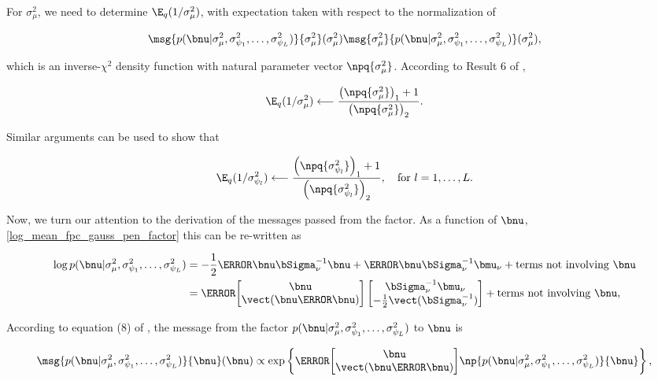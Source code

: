 \documentclass[12pt]{article}
\theoremstyle{plain}
\theoremstyle{definition}
\theoremstyle{remark}
\def\Sigmanu{\bSigma_{\nu}}
\def\munu{\bmu_{\nu}}
\def\sigsqmu{\sigma^2_{\mu}}
\newcommand\sigsqpsi[1]{\sigma^2_{\psi_{#1}}}
\newcommand\tni[1]{\text{terms not involving $#1$}}
\begin{document}
\noindent For $\sigsqmu$, we need to determine
$\E_q (1/\sigsqmu)$, with expectation taken with respect to the normalization of

\[
	\msg{p(\bnu | \sigsqmu, \sigsqpsi{1}, \dots, \sigsqpsi{L})}{\sigsqmu} (\sigsqmu)
	\msg{\sigsqmu}{p(\bnu | \sigsqmu, \sigsqpsi{1}, \dots, \sigsqpsi{L})} (\sigsqmu),
\]

\noindent which is an inverse-$\chi^2$ density function with natural parameter vector
$\npq{\sigsqmu}$. According to Result 6 of \citet{maestrini20},

\begin{equation}
	\E_q (1/\sigsqmu)
		\longleftarrow
			\frac{
				\left( \npq{\sigsqmu} \right)_1 + 1
			}{
				\left( \npq{\sigsqmu} \right)_2
			}.
\label{exp_pen_sigsqmu}
\end{equation}

\noindent Similar arguments can be used to show that

\begin{equation}
	\E_q (1/\sigsqpsi{l})
		\longleftarrow
			\frac{
				\left( \npq{\sigsqpsi{l}} \right)_1 + 1
			}{
				\left( \npq{\sigsqpsi{l}} \right)_2
			}, \quad \text{for $l = 1, \dots, L$.}
\label{exp_pen_sigsqpsi}
\end{equation}

Now, we turn our attention to the derivation of the messages passed from the factor. As a function of $\bnu$,
\eqref{log_mean_fpc_gauss_pen_factor} this can be re-written as

\begin{align*}
	\log p(\bnu | \sigsqmu, \sigsqpsi{1}, \dots, \sigsqpsi{L})
		& = -\frac12 \T{\bnu} \Sigmanu^{-1} \bnu + \T{\bnu} \Sigmanu^{-1} \munu + \tni{\bnu} \\
		& = \T{\begin{bmatrix}
			\bnu \\
			\vect (\bnu \T{\bnu})
		\end{bmatrix}} \begin{bmatrix}
			\Sigmanu^{-1} \munu \\
			-\frac12 \vect (\Sigmanu^{-1})
		\end{bmatrix} + \tni{\bnu},
\end{align*}

\noindent According to equation (8) of \citet{wand17}, the message from the factor $p(\bnu | \sigsqmu, \sigsqpsi{1}, \dots, \sigsqpsi{L})$
to $\bnu$ is

\[
	\msg{p (\bnu | \sigsqmu, \sigsqpsi{1}, \dots, \sigsqpsi{L})}{\bnu} (\bnu)
		\propto
			\exp \left\{
				\T{\begin{bmatrix}
					\bnu \\
					\vect (\bnu \T{\bnu})
				\end{bmatrix}}
				\np{p (\bnu | \sigsqmu, \sigsqpsi{1}, \dots, \sigsqpsi{L})}{\bnu}
			\right\},
\]
\end{document}
